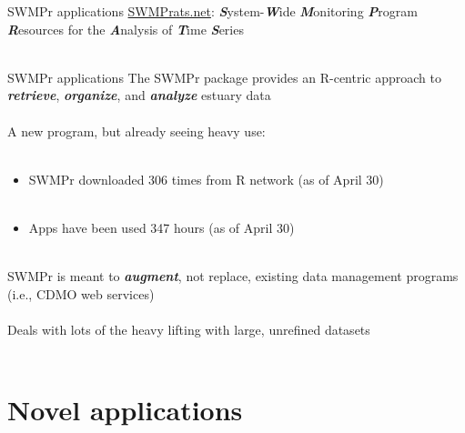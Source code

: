 \documentclass[serif]{beamer}\usepackage[]{graphicx}\usepackage[]{color}
\newcommand{\Bigtxt}[1]{\textbf{\textit{#1}}}
\begin{document}
\begin{frame}[t]{SWMPr applications}
\href{https://swmprats.net}{SWMPrats.net}: \Bigtxt{S}ystem-\Bigtxt{W}ide \Bigtxt{M}onitoring \Bigtxt{P}rogram \Bigtxt{R}esources for the \Bigtxt{A}nalysis of \Bigtxt{T}ime \Bigtxt{S}eries \\~\\
\centerline{}
\end{frame}

\begin{frame}{SWMPr applications}
The SWMPr package provides an R-centric approach to \Bigtxt{retrieve}, \Bigtxt{organize}, and \Bigtxt{analyze} estuary data \\~\\
A new program, but already seeing heavy use:\\~\\
\begin{itemize}
\item SWMPr downloaded 306 times from R network (as of April 30) \\~\\
\item Apps have been used 347 hours (as of April 30) \\~\\
\end{itemize}
SWMPr is meant to \Bigtxt{augment}, not replace, existing data management programs (i.e., CDMO web services) \\~\\
Deals with lots of the heavy lifting with large, unrefined datasets \\~\\
\end{frame}

\section{Novel applications}
\end{document}
